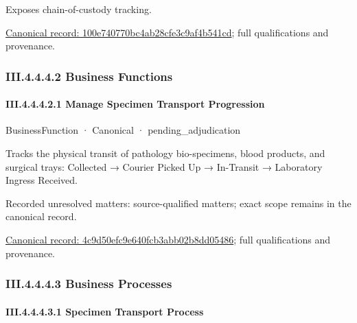 Exposes chain-of-custody tracking.


{\footnotesize \href{../../../../../../../continuum/business/business-service/100e740770bc4ab28cfe3c9af4b541cd.md}{Canonical record: 100e740770bc4ab28cfe3c9af4b541cd}; full qualifications and provenance.}\par
\subsubsection*{III.4.4.4.2 Business Functions}
\label{navigation:III.4.4.4.2}

\paragraph*{III.4.4.4.2.1 Manage Specimen Transport Progression}
\label{navigation:III.4.4.4.2.1}

\label{element:4c9d50efc9e640fcb3abb02b8dd05486}
{\small BusinessFunction · Canonical · pending\_adjudication}\par

Tracks the physical transit of pathology bio-specimens, blood products, and surgical trays: Collected → Courier Picked Up → In-Transit → Laboratory Ingress Received.


{\small Recorded unresolved matters: source-qualified matters; exact scope remains in the canonical record.}\par
{\footnotesize \href{../../../../../../../continuum/business/business-function/4c9d50efc9e640fcb3abb02b8dd05486.md}{Canonical record: 4c9d50efc9e640fcb3abb02b8dd05486}; full qualifications and provenance.}\par
\subsubsection*{III.4.4.4.3 Business Processes}
\label{navigation:III.4.4.4.3}

\paragraph*{III.4.4.4.3.1 Specimen Transport Process}
\label{navigation:III.4.4.4.3.1}

